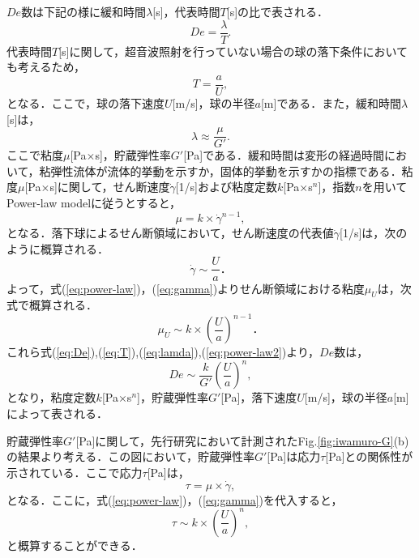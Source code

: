 $De$数は下記の様に緩和時間$\lambda$[s]，代表時間$T$[s]の比で表される．
\begin{equation}
    De = \frac{\lambda}{T} .
    \label{eq:De}
\end{equation}
代表時間$T$[s]に関して，超音波照射を行っていない場合の球の落下条件においても考えるため，
\begin{equation}
    T = \frac{a}{U} ,
    \label{eq:T}
\end{equation}
となる．ここで，球の落下速度$U$[m/s]，球の半径$a$[m]である．また，緩和時間$\lambda$[s]は，
\begin{equation}
    \lambda \approx \frac{\mu}{G'} .
    \label{eq:lamda}
\end{equation}
ここで粘度$\mu$[Pa$\times$s]，貯蔵弾性率$G'$[Pa]である．緩和時間は変形の経過時間において，粘弾性流体が流体的挙動を示すか，固体的挙動を示すかの指標である\cite{ref:sakanishi}．粘度$\mu$[Pa$\times$s]に関して，せん断速度$\dot{\gamma}$[1/s]および粘度定数$k$[Pa$\times$s${}^n$]，指数$n$を用いてPower-law modelに従うとすると，
\begin{equation}
    \mu = k \times \dot{\gamma}^{n-1} ,
    \label{eq:power-law}
\end{equation}
となる．落下球によるせん断領域において，せん断速度の代表値$\dot{\gamma}$[1/s]は，次のように概算される．
\begin{equation}
    \dot{\gamma} \sim \frac{U}{a} ．
    \label{eq:gamma}
\end{equation}
よって，式(\ref{eq:power-law})，(\ref{eq:gamma})よりせん断領域における粘度$\mu_U$は，次式で概算される．
\begin{equation}
    \mu_U \sim k \times \left(\frac{U}{a}\right)^{n-1} ．
    \label{eq:power-law2}
\end{equation}
これら式(\ref{eq:De}),(\ref{eq:T}),(\ref{eq:lamda}),(\ref{eq:power-law2})より，$De$数は，
\begin{equation}
    De \sim \frac{k}{G'} {\left(\frac{U}{a}\right)}^n ,
    \label{eq:De2}
\end{equation}
となり，粘度定数$k$[Pa$\times$s${}^n$]，貯蔵弾性率$G'$[Pa]，落下速度$U$[m/s]，球の半径$a$[m]によって表される．

貯蔵弾性率$G'$[Pa]に関して，先行研究において計測されたFig.\ref{fig:iwamuro-G}(b)の結果より考える．この図において，貯蔵弾性率$G'$[Pa]は応力$\tau$[Pa]との関係性が示されている．ここで応力$\tau$[Pa]は，
\begin{equation}
    \tau = \mu \times \dot{\gamma} ,
    \label{eq:tau}
\end{equation}
となる．ここに，式(\ref{eq:power-law})，(\ref{eq:gamma})を代入すると，
\begin{equation}
    \tau \sim k \times \left(\frac{U}{a}\right)^n , 
    \label{eq:tau-cal}
\end{equation}
と概算することができる．

